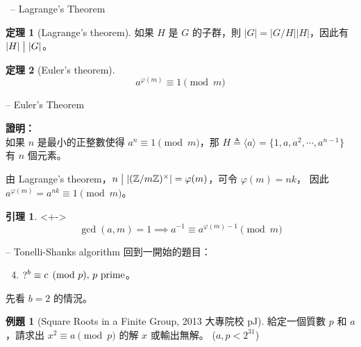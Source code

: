 \documentclass[notheorems,xcolor=dvipsnames]{beamer}
\newcommand\abs[1]{\left\lvert #1 \right\rvert}
\newcommand*{\defeq}{\triangleq}
\newcommand*{\bZ}{\mathbb{Z}}
\theoremstyle{definition}
\newtheorem{theorem}{定理}
\newtheorem{lemma}{引理}
\newtheorem{problem}{例題}
\renewenvironment{proof}{%
\begin{tcolorbox}[frame empty] {\bf 證明：}\ }{\end{tcolorbox}}
\begin{document}
\begin{frame}[t]{\secname \ -- Lagrange's Theorem}
  \begin{theorem}[Lagrange's theorem]
    如果 $H$ 是 $G$ 的子群，則 $\abs{G} = \abs{G / H} \abs{H}$，因此有 $\abs{H} \bigm\vert \abs{G}$。
  \end{theorem}
  \pause

  \bigskip
  \begin{theorem}[Euler's theorem] \vspace{-1em}
    \[ a^{\varphi(m)} \equiv 1 \pmod{m} \]
  \end{theorem}
\end{frame}

\begin{frame}[t]{{\secname} -- Euler's Theorem}
  \begin{proof} \\
    如果 $n$ 是最小的正整數使得 $a^n \equiv 1 \pmod{m}$，那
    $H \defeq \langle a \rangle = \{1, a, a^2, \cdots, a^{n-1}\}$ 有 $n$ 個元素。

    \smallskip
    由 Lagrange's theorem，$n \bigm\vert \abs{(\bZ / m\bZ)^{\times}} = \varphi(m)$，可令 $\varphi(m) = nk$，
    因此 $a^{\varphi(m)} = a^{nk} \equiv 1 \pmod{m}$。
  \end{proof}

  \begin{lemma}<+->
    \vspace{-1em}
    \[ \gcd(a, m) = 1 \implies a^{-1} \equiv a^{\varphi(m)-1} \pmod{m} \]
  \end{lemma}
\end{frame}

\begin{frame}{{\secname} -- Tonelli-Shanks algorithm}
  回到一開始的題目：
  \begin{enumerate}
    \setcounter{enumi}{3}
    \item $\raisebox{-.2mm}{\text{?}}^{b} \equiv c \pmod{p},\, p \text{ prime}$。
  \end{enumerate}
  \pause

  \bigskip
  先看 $b = 2$ 的情況。
  \begin{problem}[Square Roots in a Finite Group, 2013 大專院校 pJ]
    給定一個質數 $p$ 和 $a$，請求出 $x^2 \equiv a \pmod{p}$ 的解 $x$ 或輸出無解。
    ($a, p < 2^{31}$)
  \end{problem}
\end{frame}
\end{document}
